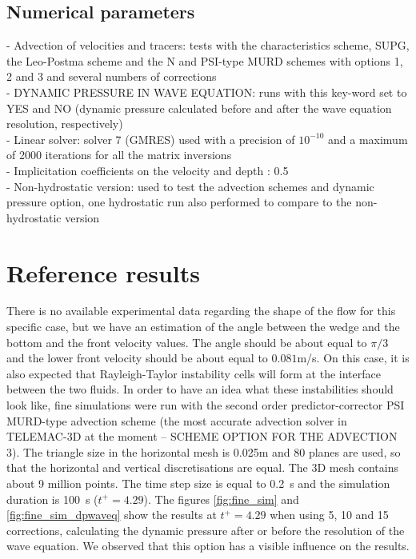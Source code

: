 \subsection{Numerical parameters}
%
- Advection of velocities and tracers: tests with the characteristics scheme, SUPG,
the Leo-Postma scheme and the N and PSI-type MURD schemes with options 1, 2 and 3 and several numbers of corrections\\
- DYNAMIC PRESSURE IN WAVE EQUATION: runs with this key-word set to YES and NO
(dynamic pressure calculated before and after the wave equation resolution, respectively)\\
- Linear solver: solver 7 (GMRES) used with a precision of $10^{-10}$ and a maximum of 2000 iterations for all the matrix inversions\\
- Implicitation coefficients on the velocity and depth : 0.5\\
- Non-hydrostatic version: used to test the advection schemes and dynamic pressure option, one hydrostatic run also performed to
compare to the non-hydrostatic version
%
%
%
%
\section{Reference results}

There is no available experimental data regarding the shape of the flow for
this specific case, but we have an estimation of the angle between the wedge and the bottom and the
front velocity values. The angle should be about equal to $\pi/3$ and the lower front
velocity should be about equal to $0.081$m/s.
On this case, it is also expected that Rayleigh-Taylor instability cells will form at the interface between the two fluids.
In order to have an idea what these instabilities should look like, fine simulations were run
with the second order predictor-corrector PSI MURD-type advection scheme
(the most accurate advection solver in TELEMAC-3D at the moment -- SCHEME OPTION FOR THE ADVECTION 3).
The triangle size in the horizontal mesh is 0.025m and 80 planes are used,
so that the horizontal and vertical discretisations are equal.
The 3D mesh contains about 9 million points. The time step size is equal to 0.2~s
and the simulation duration is 100~s ($t^+=4.29$).
The figures \ref{fig:fine_sim} and \ref{fig:fine_sim_dpwaveq} show the
results at $t^+=4.29$ when using 5, 10 and 15 corrections,
calculating the dynamic pressure after or before the resolution of the wave equation.
We observed that this option has a visible influence on the results.

